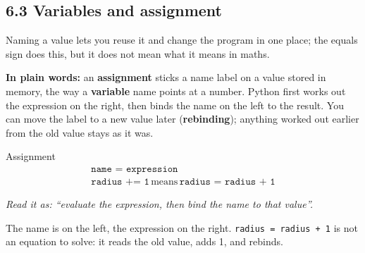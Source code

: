 \documentclass[11pt]{article}
\begin{document}
\begin{keepsection}
\section{6.3 Variables and assignment}

Naming a value lets you reuse it and change the program in one place; the equals sign does this, but it does not mean what it means in maths.

\begin{plainbox}\textbf{In plain words:} an \textbf{assignment} sticks a name label on a value stored in memory, the way a \textbf{variable} name points at a number. Python first works out the expression on the right, then binds the name on the left to the result. You can move the label to a new value later (\textbf{rebinding}); anything worked out earlier from the old value stays as it was.\end{plainbox}

\begin{equationcard}{Assignment}
\[ \begin{gathered} \texttt{name = expression} \\ \texttt{radius += 1}\, \text{means}\, \texttt{radius = radius + 1} \end{gathered} \]
{\small \emph{Read it as: “evaluate the expression, then bind the name to that value”.}\par  The name is on the left, the expression on the right. \texttt{radius = radius + 1} is not an equation to solve: it reads the old value, adds 1, and rebinds.}
\end{equationcard}

\begin{center}
\begin{minipage}[t]{0.950\linewidth}\centering
{}\par{}\end{minipage}
\end{center}


\end{keepsection}
\end{document}

